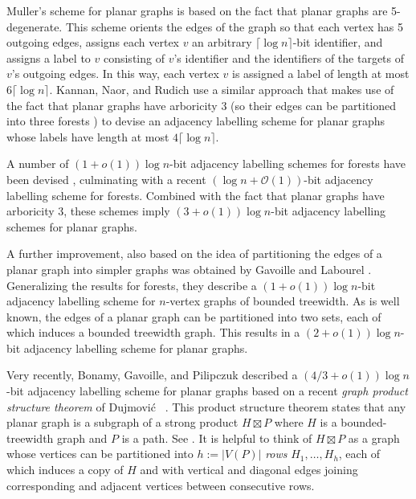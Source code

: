 \documentclass[10pt, conference, compsocconf]{IEEEtran}
\newcommand{\pnote}[1]{\ \newline\noindent\fcolorbox{red}{yellow}{\begin{minipage}{\textwidth}#1\end{minipage}}}
\newcommand{\Oh}{\mathcal{O}}
\begin{document}
Muller's scheme for planar graphs \cite{muller:local} is based on the fact that planar graphs are 5-degenerate.  This scheme orients the edges of the graph so that each vertex has 5 outgoing edges, assigns each vertex $v$ an arbitrary $\lceil\log n\rceil$-bit identifier, and assigns a label to $v$ consisting of $v$'s identifier and the identifiers of the targets of $v$'s outgoing edges.  In this way, each vertex $v$ is assigned a label of length at most $6\lceil\log n\rceil$.  Kannan, Naor, and Rudich \cite{kannan.naor.ea:implicit} use a similar approach that makes use of the fact that planar graphs have arboricity 3 (so their edges can be partitioned into three forests \cite{nash-williams:edge-disjoint}) to devise an adjacency labelling scheme for planar graphs whose labels have length at most $4\lceil\log n\rceil$.

A number of $(1+o(1))\log n$-bit adjacency labelling schemes for forests have been devised \cite{chung:universal, alstrup.rauhe:improved,alstrup.dahlgaard.ea:optimal}, culminating with a recent $(\log n + \Oh(1))$-bit adjacency labelling scheme \cite{alstrup.dahlgaard.ea:optimal} for forests.  Combined with the fact that planar graphs have arboricity 3, these schemes imply $(3+o(1))\log n$-bit adjacency labelling schemes for planar graphs.

A further improvement, also based on the idea of partitioning the edges of a planar graph into simpler graphs was obtained by Gavoille and Labourel \cite{gavoille.labourel:shorter}.  Generalizing the results for forests, they describe a $(1+o(1))\log n$-bit adjacency labelling scheme for $n$-vertex graphs of bounded treewidth. As is well known, the edges of a planar graph can be partitioned into two sets, each of which induces a bounded treewidth graph.
This results in a $(2+o(1))\log n$-bit adjacency labelling scheme for planar graphs.

Very recently, Bonamy, Gavoille, and Pilipczuk \cite{bonamy.gavoille.ea:shorter} described a $(4/3+o(1))\log n$-bit adjacency labelling scheme for planar graphs based on a recent \emph{graph product structure theorem} of Dujmović \etal\ \cite{dujmovic.joret.ea:planar}.  This product structure theorem states that any planar graph is a subgraph of a strong product $H\boxtimes P$ where $H$ is a bounded-treewidth graph and $P$ is a path. See . It is helpful to think of $H\boxtimes P$ as a graph whose vertices can be partitioned into $h:=|V(P)|$ \emph{rows} $H_1,\dots,H_{h}$, each of which induces a copy of $H$ and with vertical and diagonal edges joining corresponding and adjacent vertices between consecutive rows.
\end{document}
